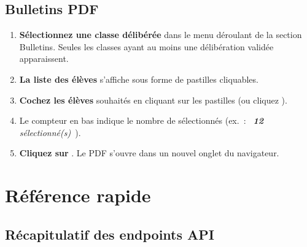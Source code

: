 \section{Bulletins PDF}

\begin{etape}[title=Proc\'edure : G\'en\'erer des bulletins]
\begin{enumerate}[leftmargin=1.5cm,label=\textbf{\arabic*.},itemsep=10pt]
  \item \textbf{S\'electionnez une classe d\'elib\'er\'ee} dans le menu d\'eroulant de la section Bulletins. Seules les classes ayant au moins une d\'elib\'eration valid\'ee apparaissent.
  \item \textbf{La liste des \'el\`eves} s'affiche sous forme de pastilles cliquables.
  \item \textbf{Cochez les \'el\`eves} souhait\'es en cliquant sur les pastilles (ou cliquez ).
  \item Le compteur en bas indique le nombre de s\'electionn\'es (ex.~: \textit{\guillemotleft~\textbf{12} s\'electionn\'e(s)~\guillemotright}).
  \item \textbf{Cliquez sur} . Le PDF s'ouvre dans un nouvel onglet du navigateur.
\end{enumerate}
\end{etape}

\chapter{R\'ef\'erence rapide}

\section{R\'ecapitulatif des endpoints API}

